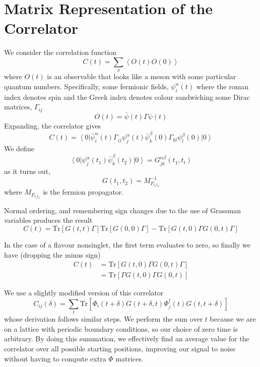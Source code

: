\documentclass[a4paper,12pt]{report}
\newcommand{\tr}[1]{\textrm{Tr}\left[ #1 \right]}
\newcommand{\ket}[1]{\ensuremath{\left| #1 \right>}} %
\newcommand{\bra}[1]{\ensuremath{\left< #1 \right|}} %
\begin{document}
\section{Matrix Representation of the Correlator}
We consider the correlation function\cite[p~217]{ Lattice_Methods}
%
\begin{equation}
C(t) = \sum_x \left< O(t) O(0) \right>
\end{equation}
%
where $O(t)$ is an observable that looks like a meson with some particular quantum numbers.
Specifically, some fermionic fields, $\psi^\alpha_i(t)$ where the roman index denotes spin and the Greek index denotes colour sandwiching some Dirac matrices, $\Gamma_{ij}$
%
\begin{equation}
O(t) = \bar{\psi}(t) \Gamma \psi(t)
\end{equation}
%
Expanding, the correlator gives
%
\begin{equation}
C(t) = \bra{0} \bar{\psi}^\alpha_i(t) \Gamma_{ij} \psi^\alpha_j(t) \bar{\psi}^\beta_k(0) \Gamma_{kl} \psi^\beta_l(0) \ket{0}
\end{equation}
%
We define
%
\begin{equation}
\bra{0} \psi^\alpha_j(t_1) \bar{\psi}^\beta_k(t_2) \ket{0} = G^{\alpha \beta}_{j k}(t_1,t_t)
\end{equation}
%
as it turns out\cite[p~52]{Lattice_Methods},
%
\begin{equation}
G(t_1,t_2) = M^{-1}_{F_{t_1 t_2}}
\end{equation}
%
where $M_{F_{t_1 t_2}}$ is the fermion propagator.

Normal ordering, and remembering sign changes due to the use of Grassman variables produces the result
%
\begin{equation}
C(t) = \tr{G(t,t) \Gamma} \tr{G(0,0)\Gamma} - \tr{G(t,0)\Gamma G(0,t) \Gamma}
\end{equation}

In the case of a flavour nonsinglet, the first term evaluates to zero\cite[p~218]{Lattice_Methods}, so finally we have (dropping the minus sign)
%
\begin{align}\label{eqn:wrong_correlator}
C(t) 	&= \tr{G(t,0)\Gamma G(0,t) \Gamma}\\
	&= \tr{\Gamma G(t,0) \Gamma G(0,t)}
\end{align}

We use a slightly modified version of this correlator
%
\begin{equation}\label{eqn:right_correlator}
C_{ij}(\delta) = \sum_t \tr{\Phi_i(t+\delta) G(t+\delta,t) \Phi^\dagger_j(t) G(t, t+\delta)}
\end{equation}
%
whose derivation follows similar steps.
We perform the sum over $t$ because we are on a lattice with periodic boundary conditions, so our choice of zero time is arbitrary.
By doing this summation, we effectively find an average value for the correlator over all possible starting positions, improving our signal to noise without having to compute extra $\Phi$ matrices.
\end{document}
